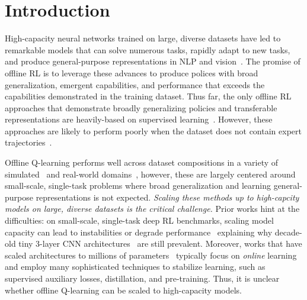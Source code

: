 \vspace{-0.5cm}
\section{Introduction}
\vspace{-0.3cm}


High-capacity neural networks trained on large, diverse datasets have led to remarkable 
models that can solve numerous tasks, rapidly adapt to new tasks, and produce general-purpose representations in NLP and vision~\citep{brown2020language,he2111masked}. %
The promise of offline RL is to leverage these advances to produce  polices with broad generalization, emergent capabilities, and performance that exceeds the capabilities demonstrated in the training dataset. %
Thus far, the only offline RL approaches that demonstrate broadly generalizing policies and transferable representations are heavily-based on supervised learning~\citep{reed2022generalist,lee2022multi}. However, these approaches are likely to perform poorly when the dataset does not contain expert trajectories~\citep{kumar2021should}.

Offline Q-learning performs well across dataset compositions in a variety of
simulated~\citep{gulcehre2020rl, fu2020d4rl} and real-world domains~\citep{chebotar2021actionable, soarespulserl},
however, these are largely centered around small-scale, single-task problems where broad generalization and learning general-purpose representations is not expected. \emph{Scaling these methods up to high-capcity models on large, diverse datasets is the critical challenge.} 
Prior works hint at the difficulties: on small-scale, single-task deep RL benchmarks, scaling model capacity can lead to instabilities or degrade performance~\citep{van2018deep,sinha2020d2rl,ota2021training} explaining why decade-old tiny 3-layer CNN architectures~\citep{mnih2013playing} are still prevalent. Moreover, works that have scaled architectures to millions of parameters~\citep{espeholt2018impala,teh2017distral, vinyals2019grandmaster,schrittwieser2021online} typically focus on \emph{online} learning and employ many sophisticated techniques to stabilize learning, such as supervised auxiliary losses, distillation, and pre-training. 
Thus, it is unclear whether offline Q-learning can be scaled to high-capacity models.

